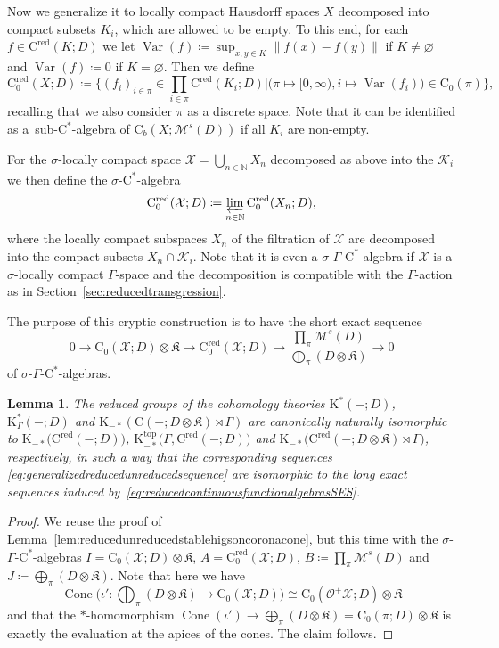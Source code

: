 \documentclass[pdftex]{sigma}
\numberwithin{equation}{section}
\newtheorem{lem}[thm]{Lemma}
\theoremstyle{definition}
\newcommand{\N}{\mathbb{N}}
\newcommand{\cO}{\mathcal{O}}
\newcommand{\cX}{\mathcal{X}}
\newcommand{\cK}{\mathcal{K}}
\newcommand{\Ct}{\mathrm{C}}
\newcommand{\Cz}{\Ct_0}
\newcommand{\Cb}{\Ct_b}
\newcommand{\CzRed}{\Ct_0^{\mathrm{red}}}
\newcommand{\CRed}{\Ct^{\mathrm{red}}}
\DeclareMathOperator{\Var}{Var}
\DeclareMathOperator{\Cone}{Cone}
\newcommand{\K}{\mathrm{K}}
\newcommand{\Ktop}{\mathrm{K}^{\mathrm{top}}}
\newcommand{\textCstar}{\ensuremath{\mathrm{C}^*\!}}
\newcommand{\Kom}{{\mathfrak{K}}}
\newcommand{\multiplier}{{\mathcal{M}}}
\newcommand{\blank}{-}
\begin{document}
Now we generalize it to locally compact Hausdorff spaces $X$ decomposed into compact subsets $K_i$, which are allowed to be empty. To this end, for each $f\in \CRed(K;D)$ we let $\Var(f)\coloneqq\sup_{x,y\in K}\|f(x)-f(y)\|$ if $K\not=\varnothing$ and $\Var(f)\coloneqq 0$ if $K=\varnothing$.
Then we define
\[
\CzRed(X;D)\coloneqq\bigg\{(f_i)_{i\in \pi}\in \prod_{i\in \pi}\CRed(K_i;D)\bigg|\big(\pi\mapsto [0,\infty),i\mapsto\Var(f_i)\big)\in \Cz(\pi)\bigg\},
\]
recalling that we also consider $\pi$ as a discrete space.
Note that it can be identified as a~sub-\textCstar-algebra of $\Cb(X;\multiplier^s(D))$ if all $K_i$ are non-empty.

For the $\sigma$-locally compact space $\cX=\bigcup_{n\in\N}X_n$ decomposed as above into the $\cK_i$ we then define the $\sigma$-\textCstar-algebra
\[
\CzRed(\cX;D)\coloneqq\varprojlim_{n\in\N}\CzRed(X_n;D),
\]
where the locally compact subspaces $X_n$ of the filtration of $\cX$ are decomposed into the compact subsets $X_n\cap \cK_i$.
Note that it is even a $\sigma$-$\Gamma$-\textCstar-algebra if $\cX$ is a $\sigma$-locally compact $\Gamma$-space and the decomposition is compatible with the $\Gamma$-action as in Section~\ref{sec:reducedtransgression}.

The purpose of this cryptic construction is to have the short exact sequence
\begin{equation}\label{eq:reducedcontinuousfunctionalgebrasSES}
0\to\Cz(\cX;D)\otimes\Kom\to \CzRed(\cX;D)\to\frac{\prod_{\pi}\multiplier^s(D)}{\bigoplus_{\pi}(D\otimes\Kom)}\to 0
\end{equation}
of $\sigma$-$\Gamma$-\textCstar-algebras.

{\sloppy\begin{lem}\label{lem:reducedKtheory}
The reduced groups of the cohomology theories $\K^*(\blank;D)$, $\K_\Gamma^*(\blank;D)$ and $\K_{-*}(\Ct(\blank;D\otimes\Kom)\rtimes\Gamma)$ are canonically naturally isomorphic to $\K_{-*}\big(\CRed(\blank;D)\big)$, $\Ktop_{-*}\big(\Gamma,\CRed(\blank;D)\big)$ and $\K_{-*}\big(\CRed(\blank;D\otimes\Kom)\rtimes\Gamma\big)$, respectively, in such a way that the corresponding sequences \eqref{eq:generalizedreducedunreducedsequence} are isomorphic to the long exact sequences induced by~\eqref{eq:reducedcontinuousfunctionalgebrasSES}.
\end{lem}}

\begin{proof}
We reuse the proof of Lemma~\ref{lem:reducedunreducedstablehigsoncoronacone}, but this time with the $\sigma$-$\Gamma$-\textCstar-algebras $I=\Cz(\cX;D)\allowbreak\otimes\Kom$, $A=\CzRed(\cX;D)$, $B\coloneqq\prod_{\pi}\multiplier^s(D)$ and $J\coloneqq \bigoplus_{\pi}(D\otimes\Kom)$. Note that here we have
\[
\Cone\biggl(\iota'\colon \bigoplus_{\pi}(D\otimes\Kom)\to \Cz(\cX;D)\biggr)\cong \Cz(\cO^+\cX;D)\otimes\Kom
\]
and that the $*$-homomorphism $\Cone(\iota')\to \bigoplus_{\pi}(D\otimes\Kom)= \Cz(\pi;D)\otimes\Kom$ is exactly the evaluation at the apices of the cones. The claim follows.
\end{proof}
\end{document}
